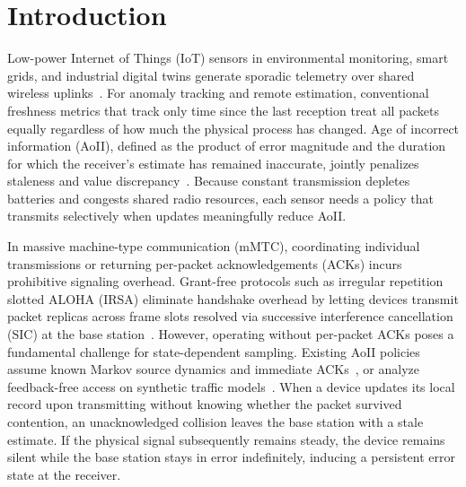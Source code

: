 \documentclass[conference]{IEEEtran}
\begin{document}
\section{Introduction}
\label{sec:intro}

  Low-power Internet of Things (IoT) sensors in environmental monitoring, smart grids, and industrial digital twins generate sporadic telemetry over shared wireless uplinks~\cite{truong2022haivan,nguyen2024security}.
  For anomaly tracking and remote estimation, conventional freshness metrics that track only time since the last reception treat all packets equally regardless of how much the physical process has changed.
  Age of incorrect information (AoII), defined as the product of error magnitude and the duration for which the receiver's estimate has remained inaccurate, jointly penalizes staleness and value discrepancy~\cite{maatouk2022age}.
  Because constant transmission depletes batteries and congests shared radio resources, each sensor needs a policy that transmits selectively when updates meaningfully reduce AoII.

  \figSystemModel

  In massive machine-type communication (mMTC), coordinating individual transmissions or returning per-packet acknowledgements (ACKs) incurs prohibitive signaling overhead.
  Grant-free protocols such as irregular repetition slotted ALOHA (IRSA) eliminate handshake overhead by letting devices transmit packet replicas across frame slots resolved via successive interference cancellation (SIC) at the base station~\cite{munari2021modern}.
  However, operating without per-packet ACKs poses a fundamental challenge for state-dependent sampling.
  Existing AoII policies assume known Markov source dynamics and immediate ACKs~\cite{maatouk2022age,tong2023semantic,nayak2023decentralized}, or analyze feedback-free access on synthetic traffic models~\cite{munari2024monitoring,mubarak2026threshold}.
  When a device updates its local record upon transmitting without knowing whether the packet survived contention, an unacknowledged collision leaves the base station with a stale estimate.
  If the physical signal subsequently remains steady, the device remains silent while the base station stays in error indefinitely, inducing a persistent error state at the receiver.
\end{document}
